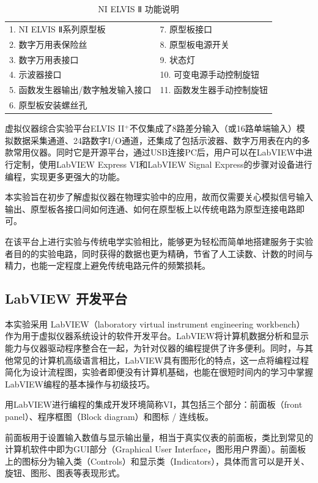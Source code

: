 \documentclass[UTF8]{article}
\theoremstyle{MyLineTheoremStyle} %
\theoremstyle{MyBlockTheoremStyle} %
\theoremstyle{MySubsubsectionStyle} %
\begin{document}
\begin{table}[H]\centering
    \caption{NI ELVIS Ⅱ 功能说明}
    \label{NI ELVIS Ⅱ 功能说明}
\begin{tabular}{ll}\toprule
    1. NI ELVIS Ⅱ系列原型板 &  7. 原型板接口 \\
    2. 数字万用表保险丝 & 8. 原型板电源开关 \\
    3. 数字万用表接口 & 9. 状态灯 \\
    4. 示波器接口 & 10. 可变电源手动控制旋钮 \\
    5. 函数发生器输出/数字触发输入接口 & 11. 函数发生器手动控制旋钮 \\
    6. 原型板安装螺丝孔 &  \\
    \bottomrule
\end{tabular}
\end{table}

虚拟仪器综合实验平台ELVIS II$ ^+ $不仅集成了8路差分输入（或16路单端输入）模拟数据采集通道、24路数字I/O通道，还集成了包括示波器、数字万用表在内的多款常用仪器。同时它是开源平台，通过USB连接PC后，用户可以在LabVIEW中进行定制，使用LabVIEW Express VI和LabVIEW Signal Express的步骤对设备进行编程，实现更多更强大的功能。	

本实验旨在初步了解虚拟仪器在物理实验中的应用，故而仅需要关心模拟信号输入输出、原型板各接口间如何连通、如何在原型板上以传统电路为原型连接电路即可。

在该平台上进行实验与传统电学实验相比，能够更为轻松而简单地搭建服务于实验者目的的实验电路，同时获得的数据也更为精确，节省了人工读数、计数的时间与精力，也能一定程度上避免传统电路元件的频繁损耗。

\subsection{LabVIEW 开发平台}

本实验采用 LabVIEW（laboratory virtual instrument engineering workbench）作为用于虚拟仪器系统设计的软件开发平台。LabVIEW将计算机数据分析和显示能力与仪器驱动程序整合在一起，为针对仪器的编程提供了许多便利。同时，与其他常见的计算机高级语言相比，LabVIEW具有图形化的特点，这一点将编程过程简化为设计流程图，实验者即便没有计算机基础，也能在很短时间内的学习中掌握LabVIEW编程的基本操作与初级技巧。

用LabVIEW进行编程的集成开发环境简称VI，其包括三个部分：前面板（front panel）、程序框图（Block diagram）和图标 / 连线板。

前面板用于设置输入数值与显示输出量，相当于真实仪表的前面板，类比到常见的计算机软件中即为GUI部分（Graphical User Interface，图形用户界面）。前面板上的图标分为输入类（Controls）和显示类（Indicators），具体而言可以是开关、旋钮、图形、图表等表现形式。
\end{document}

